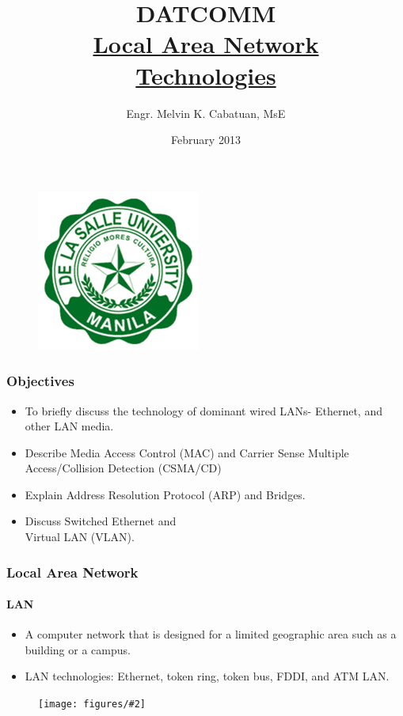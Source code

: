 \documentclass{beamer}
\newcommand{\ns}{\vspace{-0.5cm}}  %
\newcommand{\fig}[2]{
\begin{center}
\begin{figure}
\texttt{[image: figures/\#2]}
\end{figure}
\end{center}
}
\begin{document}
\ECFAugie

\begin{frame}

\begin{center}
\begin{figure}
\includegraphics[scale=0.3]{figures/dlsulogo}
\end{figure}
\end{center}
\ns

\title{DATCOMM  \\ \underline{Local Area Network} \\ \underline{Technologies}}
\author{Engr. Melvin K. Cabatuan, MsE}
\date{February 2013}
\maketitle
\end{frame}

\begin{frame}
\frametitle{Objectives}
\begin{itemize} 
\Large
\item <1-> To briefly discuss the technology of dominant wired LANs- Ethernet, and other LAN media.
\item <2-> Describe Media Access Control (MAC) and Carrier Sense Multiple Access/Collision Detection (CSMA/CD)
\item <3-> Explain Address Resolution Protocol (ARP) and Bridges.
\item <4-> Discuss Switched Ethernet and \\ Virtual LAN (VLAN).

\end{itemize}
\end{frame}

 


\begin{frame}
\frametitle{Local Area Network}
\framesubtitle{LAN}
\begin{itemize} 
\Large
\item <1-> A computer network that is designed for a limited geographic area such as a building or a campus. 
\item <2-> LAN technologies: Ethernet, token ring, token bus, FDDI, and ATM LAN.
\end{itemize}
\fig{0.65}{network_lan}
\end{frame}
\end{document}
